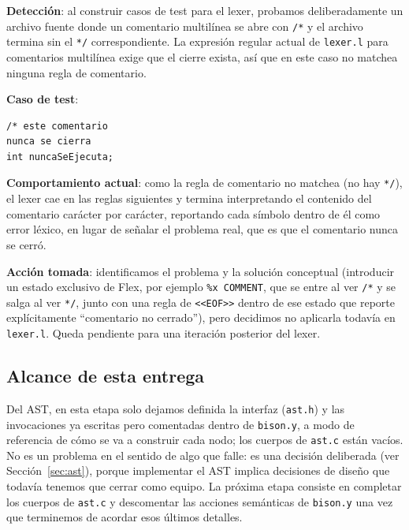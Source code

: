\documentclass[11pt,a4paper]{article}
\begin{document}
\textbf{Detección}: al construir casos de test para el lexer, probamos
deliberadamente un archivo fuente donde un comentario multilínea se abre con
\texttt{/*} y el archivo termina sin el \texttt{*/} correspondiente. La
expresión regular actual de \texttt{lexer.l} para comentarios multilínea
exige que el cierre exista, así que en este caso no matchea ninguna regla de
comentario.

\textbf{Caso de test}:
\begin{verbatim}
/* este comentario
nunca se cierra
int nuncaSeEjecuta;
\end{verbatim}

\textbf{Comportamiento actual}: como la regla de comentario no matchea (no
hay \texttt{*/}), el lexer cae en las reglas siguientes y termina
interpretando el contenido del comentario carácter por carácter, reportando
cada símbolo dentro de él como error léxico, en lugar de señalar el problema
real, que es que el comentario nunca se cerró.

\textbf{Acción tomada}: identificamos el problema y la solución conceptual
(introducir un estado exclusivo de Flex, por ejemplo \texttt{\%x COMMENT},
que se entre al ver \texttt{/*} y se salga al ver \texttt{*/}, junto con una
regla de \texttt{<<EOF>>} dentro de ese estado que reporte explícitamente
``comentario no cerrado''), pero decidimos no aplicarla todavía en
\texttt{lexer.l}. Queda pendiente para una iteración posterior del lexer.

\subsection{Alcance de esta entrega}

Del AST, en esta etapa solo dejamos definida la interfaz (\texttt{ast.h}) y
las invocaciones ya escritas pero comentadas dentro de \texttt{bison.y}, a
modo de referencia de cómo se va a construir cada nodo; los cuerpos de
\texttt{ast.c} están vacíos. No es un problema en el sentido de algo que
falle: es una decisión deliberada (ver Sección~\ref{sec:ast}), porque
implementar el AST implica decisiones de diseño que todavía tenemos que
cerrar como equipo. La próxima etapa consiste en completar los cuerpos de
\texttt{ast.c} y descomentar las acciones semánticas de \texttt{bison.y} una
vez que terminemos de acordar esos últimos detalles.
\end{document}
